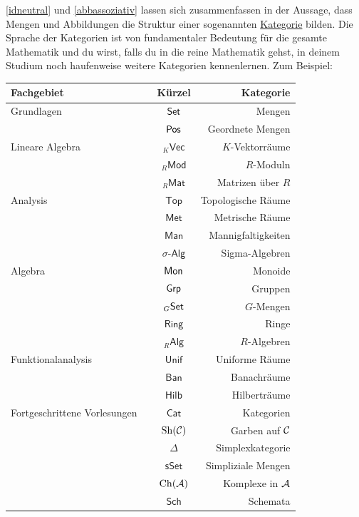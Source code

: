 \begin{vorschau} \label{kategorien}
    \cref{idneutral} und \cref{abbassoziativ} lassen sich zusammenfassen in der Aussage, dass Mengen und Abbildungen die Struktur einer sogenannten \href{https://ncatlab.org/nlab/show/category}{Kategorie} bilden. Die Sprache der Kategorien ist von fundamentaler Bedeutung für die gesamte Mathematik und du wirst, falls du in die reine Mathematik gehst, in deinem Studium noch haufenweise weitere Kategorien kennenlernen. Zum Beispiel:
    \begin{longtable}{lccr}
    Fachgebiet & \phantom{Platzhalter} & Kürzel & \phantom{Platzhalterhalter} Kategorie \\
    \midrule
    Grundlagen && $\mathsf{Set}$ & Mengen \\ 
    && $\mathsf{Pos}$ & Geordnete Mengen \\[0.5em]
    Lineare Algebra && ${}_K\mathsf{Vec}$ & $K$-Vektorräume \\
    && ${}_R\mathsf{Mod}$ & $R$-Moduln \\
    && ${}_R\mathsf{Mat}$ & Matrizen über $R$ \\[0.5em]
    Analysis && $\mathsf{Top}$ & Topologische Räume \\
    && $\mathsf{Met}$ & Metrische Räume \\
    && $\mathsf{Man}$ & Mannigfaltigkeiten \\
    && $\sigma\textsf{-Alg}$ & Sigma-Algebren \\[0.5em]
    Algebra && $\mathsf{Mon}$ & Monoide \\
    && $\mathsf{Grp}$ & Gruppen \\
    && ${}_G\mathsf{Set}$ & $G$-Mengen \\
    && $\mathsf{Ring}$ & Ringe \\
    && ${}_R\mathsf{Alg}$ & $R$-Algebren \\[0.5em]
    Funktionalanalysis && $\mathsf{Unif}$ & Uniforme Räume \\
    && $\mathsf{Ban}$ & Banachräume \\
    && $\mathsf{Hilb}$ & Hilberträume \\[0.5em]
    Fortgeschrittene Vorlesungen && $\mathsf{Cat}$ & Kategorien \\
    && $\mathrm{Sh}(\mathcal C)$ & Garben auf $\mathcal C$ \\
    && $\Delta$ & Simplexkategorie \\
    && $\mathsf{sSet}$ & Simpliziale Mengen \\
    && $\mathrm{Ch}(\mathcal A)$ & Komplexe in $\mathcal A$ \\
    && $\mathsf{Sch}$ & Schemata \\
    \end{longtable}
\end{vorschau}


